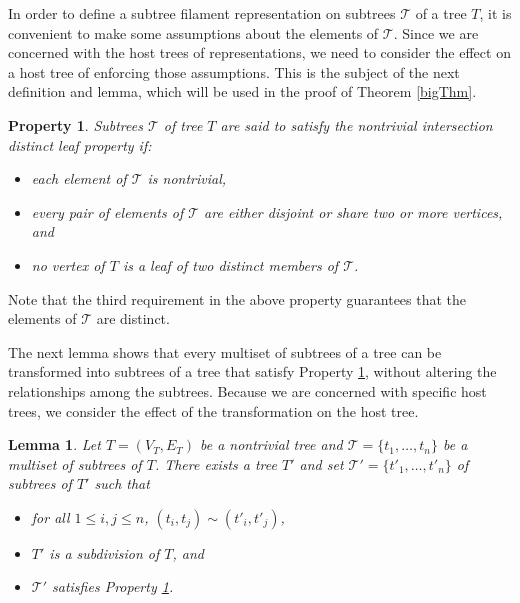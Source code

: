 \documentclass[
final
]{dmtcs-episciences}        \usepackage{graphics, amsthm, amsmath, amssymb, algorithm, algorithmic}
\newtheorem{lemma}{Lemma}
\newtheorem{property}{Property}
\begin{document}
In order to define a subtree filament representation on subtrees $\mathcal T$ of a tree $T$, it is convenient to make some assumptions about the elements of $\mathcal T$. Since we are concerned with the host trees of representations, we need to consider the effect on a host tree of enforcing those assumptions. This is the subject of the next definition and lemma, which will be used in the proof of Theorem \ref{bigThm}.

\begin{property}\label{A}
Subtrees
$\mathcal{T}$ of tree $T$ are said to satisfy the {\em nontrivial intersection distinct leaf property} if:
\begin{itemize}
\item
each element of $\mathcal{T}$ is nontrivial, 
\item
every pair of elements of $\mathcal{T}$ are either disjoint or share two or more vertices, and 
\item
no vertex of $T$ is a leaf of two distinct members of $ \mathcal{T}$.
\end{itemize}
\end{property}


Note that the third requirement in the above property guarantees that the elements of $\mathcal T$ are distinct.

The next lemma shows that every multiset of subtrees of a tree can be transformed into subtrees of a tree that satisfy Property \ref{A}, without altering the relationships among the subtrees.
Because we are concerned with specific host trees, we consider the effect of the transformation on the host tree.


\begin{lemma} \label{lem:bushyGivesNice}
Let $T=(V_T, E_T)$ be a nontrivial tree and $\mathcal{T} = \{ t_1, \ldots, t_n  \}$ be a multiset of subtrees of $T$.
There exists a tree $T'$ and set $\mathcal{T}' = \{ t'_1, \ldots, t'_n \}$ of subtrees of $T'$ such that
\begin{itemize}
\item
for all $1 \le i,j \le n$, $(t_i, t_j) \sim (t'_i, t'_j)$,
\item
$T'$ is a subdivision of $T$,
and
\item
$\mathcal{T}'$ satisfies Property \ref{A}.
\end{itemize}
\end{lemma}
\end{document}
